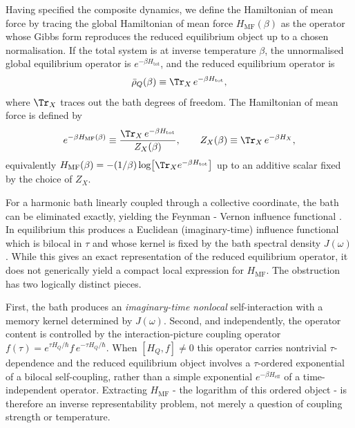 Having specified the composite dynamics, we define the Hamiltonian of mean force by tracing the global
Hamiltonian of mean force $H_{\mathrm{MF}}(\beta)$ as the operator whose Gibbs
form reproduces the reduced equilibrium object up to a chosen normalisation. If
the total system is at inverse temperature $\beta$, the unnormalised global
equilibrium operator is $e^{-\beta H_{\mathrm{tot}}}$, and the reduced
equilibrium operator is
\begin{equation}
    \bar{\rho}_Q(\beta)\equiv \Tr_X\, e^{-\beta H_{\mathrm{tot}}} ,
    \label{eq:reduced_equilibrium_operator}
\end{equation}
where $\Tr_X$ traces out the bath degrees of freedom. The Hamiltonian of mean
force is defined by
\begin{equation}
    e^{-\beta H_{\mathrm{MF}}(\beta)}
    \equiv
    \frac{\Tr_X\, e^{-\beta H_{\mathrm{tot}}}}{Z_X(\beta)},
    \qquad
    Z_X(\beta)\equiv \Tr_X\, e^{-\beta H_X},
    \label{eq:HMF_def}
\end{equation}
equivalently
$H_{\mathrm{MF}}(\beta)=-(1/\beta)\log\!\big[\Tr_X e^{-\beta H_{\mathrm{tot}}}\big]$
up to an additive scalar fixed by the choice of $Z_X$.

For a harmonic bath linearly coupled through a collective coordinate, the bath
can be eliminated exactly, yielding the Feynman - Vernon influence functional
\cite{feynmanTheoryGeneralQuantum1963a,caldeiraQuantumTunnellingDissipative1983a,grabertQuantumBrownianMotion1988}.
In equilibrium this produces a Euclidean (imaginary-time) influence functional
which is bilocal in $\tau$ and whose kernel is fixed by the bath spectral
density $J(\omega)$. While this gives an exact representation of the reduced
equilibrium operator, it does not generically yield a compact local expression
for $H_{\mathrm{MF}}$. The obstruction has two logically distinct pieces.

First, the bath produces an \emph{imaginary-time nonlocal} self-interaction with
a memory kernel determined by $J(\omega)$. Second, and independently, the
operator content is controlled by the interaction-picture coupling operator
$f(\tau)=e^{\tau H_Q/\hbar} f\, e^{-\tau H_Q/\hbar}$. When $[H_Q,f]\neq 0$ this
operator carries nontrivial $\tau$-dependence and the reduced equilibrium object
involves a $\tau$-ordered exponential of a bilocal self-coupling, rather than a
simple exponential $e^{-\beta H_{\mathrm{eff}}}$ of a time-independent operator.
Extracting $H_{\mathrm{MF}}$ - the logarithm of this ordered object - is
therefore an inverse representability problem, not merely a question of coupling
strength or temperature.

